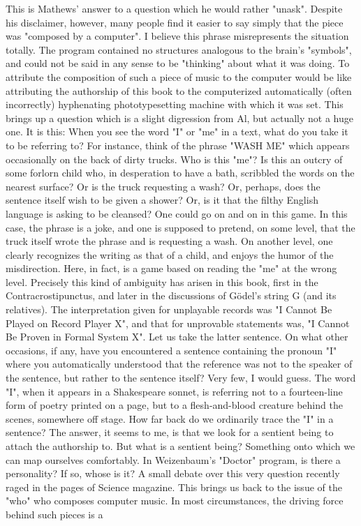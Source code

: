 {     This is Mathews' answer to a question which he would rather "unask". Despite his
disclaimer, however, many people find it easier to say simply that the piece was
"composed by a computer". I believe this phrase misrepresents the situation totally. The
program contained no structures analogous to the brain's "symbols", and could not be said
in any sense to be "thinking" about what it was doing. To attribute the composition of
such a piece of music to the computer would be like attributing the authorship of this
book to the computerized automatically (often incorrectly) hyphenating phototypesetting
machine with which it was set.
     This brings up a question which is a slight digression from Al, but actually not a
huge one. It is this: When you see the word "I" or "me" in a text, what do you take it to be
referring to? For instance, think of the phrase "WASH ME" which appears occasionally
on the back of dirty trucks. Who is this "me"? Is this an outcry of some forlorn child who,
in desperation to have a bath, scribbled the words on the nearest surface? Or is the truck
requesting a wash? Or, perhaps, does the sentence itself wish to be given a shower? Or, is
it that the filthy English language is asking to be cleansed? One could go on and on in
this game. In this case, the phrase is a joke, and one is supposed to pretend, on some
level, that the truck itself wrote the phrase and is requesting a wash. On another level, one
clearly recognizes the writing as that of a child, and enjoys the humor of the misdirection.
Here, in fact, is a game based on reading the "me" at the wrong level.
     Precisely this kind of ambiguity has arisen in this book, first in the
Contracrostipunctus, and later in the discussions of Gödel’s string G (and its relatives).
The interpretation given for unplayable records was "I Cannot Be Played on Record
Player X", and that for unprovable statements was, "I Cannot Be Proven in Formal
System X". Let us take the latter sentence. On what other occasions, if any, have you
encountered a sentence containing the pronoun "I" where you automatically understood
that the reference was not to the speaker of the sentence, but rather to the sentence itself?
Very few, I would guess. The word "I", when it appears in a Shakespeare sonnet, is
referring not to a fourteen-line form of poetry printed on a page, but to a flesh-and-blood
creature behind the scenes, somewhere off stage.
     How far back do we ordinarily trace the "I" in a sentence? The answer, it seems to
me, is that we look for a sentient being to attach the authorship to. But what is a sentient
being? Something onto which we can map ourselves comfortably. In Weizenbaum's
"Doctor" program, is there a personality? If so, whose is it? A small debate over this very
question recently raged in the pages of Science magazine.
     This brings us back to the issue of the "who" who composes computer music. In
most circumstances, the driving force behind such pieces is a




}
